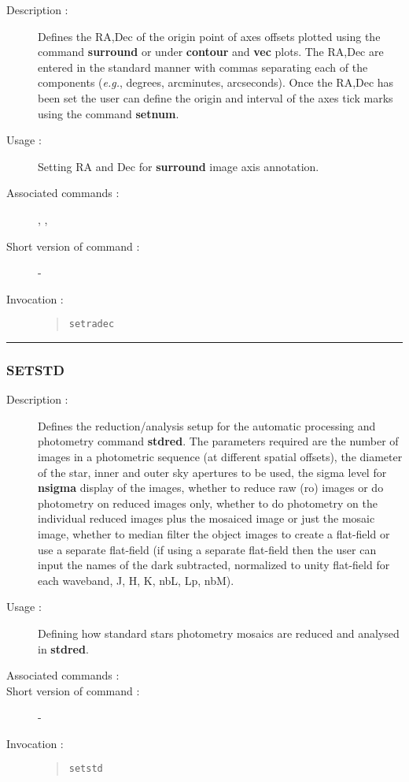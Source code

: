 \begin{description}

\item[Description :] Defines the RA,Dec of the origin point of axes
offsets plotted using the command {\bf surround} or under {\bf contour}
and {\bf vec} plots.  The RA,Dec are entered in the standard manner
with commas separating each of the components (\emph{e.g.}, degrees,
arcminutes, arcseconds).  Once the RA,Dec has been set the user can
define the origin and interval of the axes tick marks using the command
{\bf setnum}.

\item[Usage :] Setting RA and Dec for {\bf surround} image axis annotation.

\item[Associated commands :] {\tt {}}, 
{\tt {}}, {\tt {}}

\item[Short version of command :] -
\item[Invocation :]

\begin{quote}{\tt  setradec }\end{quote}

\end{description}

\hrule 
\subsubsection*{\label{SETSTD}SETSTD}

\begin{description}

\item[Description :] Defines the reduction/analysis setup for the
automatic processing and photometry command {\bf stdred}.  The
parameters required are the number of images in a photometric sequence
(at different spatial offsets), the diameter of the star, inner and
outer sky apertures to be used, the sigma level for {\bf nsigma}
display of the images, whether to reduce raw ({\sc ro}) images or do
photometry on reduced images only, whether to do photometry on the
individual reduced images plus the mosaiced image or just the mosaic
image, whether to median filter the object images to create a
flat-field or use a separate flat-field (if using a separate flat-field
then the user can input the names of the dark subtracted, normalized to
unity flat-field for each waveband, J, H, K, nbL, Lp, nbM).

\item[Usage :] Defining how standard stars photometry mosaics are
reduced and analysed in {\bf stdred}.

\item[Associated commands :] {\tt {}}
\item[Short version of command :] -
\item[Invocation :]

\begin{quote}{\tt  setstd }\end{quote}

\end{description}

